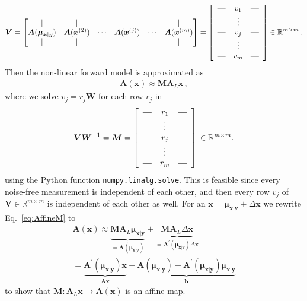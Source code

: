 \begin{align}
	\bm{V} = \begin{bmatrix}
		\vert& \vert&   &  \vert & & \vert \\
		\bm{A}(\bm{\mu}_{\bm{x}|\bm{y}} ) & \bm{A}(\bm{x}^{(2)}) &  \cdots& \bm{A}(\bm{x}^{(j)}) &  \cdots & \bm{A} (\bm{x}^{(m)})  \\
		\vert&\vert&   &  \vert & & \vert 
	\end{bmatrix} = 
	\begin{bmatrix}
		\begin{array}{ccc}
			\horzbar & v_{1} & \horzbar \\
			& \vdots    &          \\
			\horzbar & v_{j} & \horzbar \\
			& \vdots    &          \\
			\horzbar &v_{m} & \horzbar
		\end{array}
	\end{bmatrix}\in \mathbb{R}^{m \times m} \, .
\end{align}
Then the non-linear forward model is approximated as 
\begin{align}
	\bm{A}(\bm{x}) \approx \bm{M A}_L \bm{x} \, , \label{eq:AffineM}
\end{align}
where we solve $v_j =r_j \bm{W}$ for each row $r_j$ in
\begin{align}
	\bm{V}\bm{W}^{-1} = \bm{M} =
	\begin{bmatrix}
		\begin{array}{ccc}
			\horzbar & r_{1} & \horzbar \\
			& \vdots    &          \\
			\horzbar & r_{j} & \horzbar \\
			& \vdots    &          \\
			\horzbar &r_{m} & \horzbar
		\end{array}
	\end{bmatrix}\, \in \mathbb{R}^{m \times m} .
\end{align}
using the Python function \texttt{numpy.linalg.solve}.
This is feasible since every noise-free measurement is independent of each other, and then every row $v_j$ of $\bm{V} \in \mathbb{R}^{m \times m}$ is independent of each other as well.
For an $\bm{x} = \bm{\mu}_{\bm{x}|\bm{y}} + \Delta \bm{x}$ we rewrite Eq.~\ref{eq:AffineM} to
\begin{align}
	\bm{A}(\bm{x})  \approx \underbrace{  \bm{M A}_L  \bm{\mu}_{\bm{x}|\bm{y}} }_{= \bm{A}( \bm{\mu}_{\bm{x}|\bm{y}} )  }+  \underbrace{\bm{M A}_L  \Delta \bm{x} }_{= \bm{A}^{\prime}( \bm{\mu}_{\bm{x}|\bm{y}} )  \Delta \bm{x} }\, \\
	=    \underbrace{ \bm{A}^{\prime}( \bm{\mu}_{\bm{x}|\bm{y}} ) \bm{x}}_{ \bm{A}\bm{x}}  +  \underbrace{ \bm{A}( \bm{\mu}_{\bm{x}|\bm{y}} )  - \bm{A}^{\prime}( \bm{\mu}_{\bm{x}|\bm{y}} ) \bm{\mu}_{\bm{x}|\bm{y}}}_{  \bm{b}}
\end{align}
to show that $ \bm{M}:\bm{A}_L\bm{x} \rightarrow \bm{A}(\bm{x})$ is an affine map.







